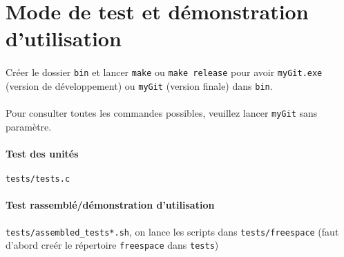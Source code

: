 \documentclass{report}
\begin{document}
\section*{Mode de test et démonstration d'utilisation}

\paragraph{} Créer le dossier \verb|bin| et lancer \verb|make| ou \verb|make release|
pour avoir \verb|myGit.exe| (version de développement) ou \verb|myGit| (version finale) dans \verb|bin|.

\paragraph{} Pour consulter toutes les commandes possibles, veuillez lancer \verb|myGit| sans paramètre.

\paragraph{Test des unités} \verb|tests/tests.c|
\paragraph{Test rassemblé/démonstration d'utilisation}\verb|tests/assembled_tests*.sh|, 
on lance les scripts dans \verb|tests/freespace| (faut d'abord creér le répertoire \verb|freespace| dans \verb|tests|)
\end{document}
